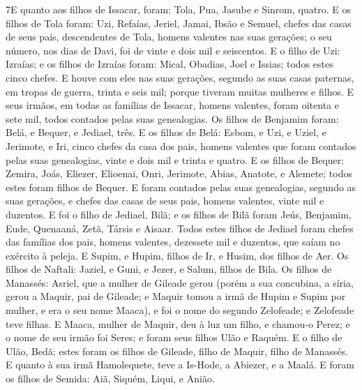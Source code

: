 \medskip

\lettrine{7} E quanto aos filhos de Issacar, foram: Tola, Pua,
Jasube e Sinrom, quatro. E os filhos de Tola foram: Uzi,
Refaías, Jeriel, Jamai, Ibsão e Semuel, chefes das casas de seus
pais, descendentes de Tola, homens valentes nas suas gerações; o seu
número, nos dias de Davi, foi de vinte e dois mil e seiscentos.
E o filho de Uzi: Izraías; e os filhos de Izraías foram: Mical,
Obadias, Joel e Issias; todos estes cinco chefes. E houve com
eles nas suas gerações, segundo as suas casas paternas, em tropas de
guerra, trinta e seis mil; porque tiveram muitas mulheres e filhos.
E seus irmãos, em todas as famílias de Issacar, homens valentes,
foram oitenta e sete mil, todos contados pelas suas genealogias.
Os filhos de Benjamim foram: Belá, e Bequer, e Jediael, três.
E os filhos de Belá: Esbom, e Uzi, e Uziel, e Jerimote, e Iri,
cinco chefes da casa dos pais, homens valentes que foram contados
pelas suas genealogias, vinte e dois mil e trinta e quatro. E os
filhos de Bequer: Zemira, Joás, Eliezer, Elioenai, Onri, Jerimote,
Abias, Anatote, e Alemete; todos estes foram filhos de Bequer. E
foram contados pelas suas genealogias, segundo as suas gerações, e
chefes das casas de seus pais, homens valentes, vinte mil e
duzentos. E foi o filho de Jediael, Bilã; e os filhos de Bilã
foram Jeús, Benjamim, Eude, Quenaaná, Zetã, Társis e Aisaar.
Todos estes filhos de Jediael foram chefes das famílias dos
pais, homens valentes, dezessete mil e duzentos, que saíam no
exército à peleja. E Supim, e Hupim, filhos de Ir, e Husim,
dos filhos de Aer. Os filhos de Naftali: Jaziel, e Guni, e
Jezer, e Salum, filhos de Bila. Os filhos de Manassés:
Asriel, que a mulher de Gileade gerou (porém a sua concubina, a
síria, gerou a Maquir, pai de Gileade; e Maquir tomou a irmã
de Hupim e Supim por mulher, e era o seu nome Maaca), e foi o nome
do segundo Zelofeade; e Zelofeade teve filhas. E Maaca,
mulher de Maquir, deu à luz um filho, e chamou-o Perez; e o nome de
seu irmão foi Seres; e foram seus filhos Ulão e Raquém. E o
filho de Ulão, Bedã; estes foram os filhos de Gileade, filho de
Maquir, filho de Manassés. E quanto à sua irmã Hamolequete,
teve a Is-Hode, a Abiezer, e a Maalá. E foram os filhos de
Semida: Aiã, Siquém, Liqui, e Anião.

